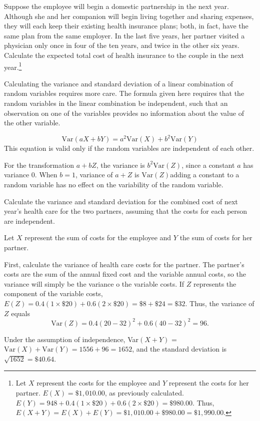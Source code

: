 \begin{exercise} \label{healthCareCostsPartner}
	Suppose the employee will begin a domestic partnership in the next year. Although she and her companion will begin living together and sharing expenses, they will each keep their existing health insurance plans; both, in fact, have the same plan from the same employer. In the last five years, her partner visited a physician only once in four of the ten years, and twice in the other six years. Calculate the expected total cost of health insurance to the couple in the next year.\footnote{Let $X$ represent the costs for the employee and $Y$ represent the costs for her partner. $E(X) = \$1,010.00$, as previously calculated. $E(Y) = 948 + 0.4(1 \times \$20) + 0.6(2 \times \$20) = \$980.00$. Thus, $E(X + Y) = E(X) + E(Y) = \$1,010.00 + \$980.00 = \$1,990.00$.}
\end{exercise}

Calculating the variance and standard deviation of a linear combination of random variables requires more care.  The formula given here requires that the random variables in the linear combination be independent, such that an observation on one of the variables provides no information about the value of the other variable. 

\begin{termBox}{
\[\text{Var}(aX + bY) = a^2 \text{Var}(X) + b^2\text{Var}(Y)\]
		This equation is valid only if the random variables are independent of each other.}
\end{termBox}

For the transformation $a + bZ$, the variance is $b^{2} \text{Var}(Z)$, since a constant $a$ has variance 0.  When $b = 1$, variance of $a + Z$ is $\text{Var}(Z)$\textemdash adding a constant to a random variable has no effect on the variability of the random variable.

\newpage

\begin{example}{Calculate the variance and standard deviation for the combined cost of next year's health care for the two partners, assuming that the costs for each person are independent.}

Let $X$ represent the sum of costs for the employee and $Y$ the sum of costs for her partner.
	
First, calculate the variance of health care costs for the partner. The partner's costs are the sum of the annual fixed cost and the variable annual costs, so the variance will simply be the variance o the variable costs. If $Z$ represents the component of the variable costs, $E(Z) = 0.4(1 \times \$20) + 0.6(2 \times \$20) = \$8 + \$24 = \$32$. Thus, the variance of $Z$ equals
\[\textrm{Var}(Z) = 0.4(20 - 32)^2 + 0.6(40 - 32)^2 = 96. \]

Under the assumption of independence, Var$(X + Y)$ = $\text{Var}(X) + \text{Var}(Y) = 1556 + 96 = 1652$, and the standard deviation is $\sqrt{1652} = \$40.64$.

\end{example}

